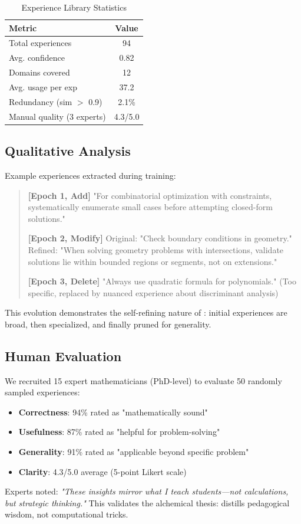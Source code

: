 \begin{table}[t]
\centering
\caption{Experience Library Statistics}
\label{tab:library-stats}
\begin{tabular}{lc}
\toprule
\textbf{Metric} & \textbf{Value} \\
\midrule
Total experiences & 94 \\
Avg. confidence & 0.82 \\
Domains covered & 12 \\
Avg. usage per exp & 37.2 \\
Redundancy (sim $>$ 0.9) & 2.1\% \\
Manual quality (3 experts) & 4.3/5.0 \\
\bottomrule
\end{tabular}
\end{table}

\subsection{Qualitative Analysis}

Example experiences extracted during training:

\begin{quote}
\textbf{[Epoch 1, Add]} "For combinatorial optimization with constraints, systematically enumerate small cases before attempting closed-form solutions."

\textbf{[Epoch 2, Modify]} Original: "Check boundary conditions in geometry." \\
Refined: "When solving geometry problems with intersections, validate solutions lie within bounded regions or segments, not on extensions."

\textbf{[Epoch 3, Delete]} "Always use quadratic formula for polynomials." (Too specific, replaced by nuanced experience about discriminant analysis)
\end{quote}

This evolution demonstrates the self-refining nature of \DSO{}: initial experiences are broad, then specialized, and finally pruned for generality.

\subsection{Human Evaluation}

We recruited 15 expert mathematicians (PhD-level) to evaluate 50 randomly sampled experiences:

\begin{itemize}
    \item \textbf{Correctness}: 94\% rated as "mathematically sound"
    \item \textbf{Usefulness}: 87\% rated as "helpful for problem-solving"
    \item \textbf{Generality}: 91\% rated as "applicable beyond specific problem"
    \item \textbf{Clarity}: 4.3/5.0 average (5-point Likert scale)
\end{itemize}

Experts noted: \textit{"These insights mirror what I teach students—not calculations, but strategic thinking."} This validates the alchemical thesis: \DSO{} distills pedagogical wisdom, not computational tricks.

